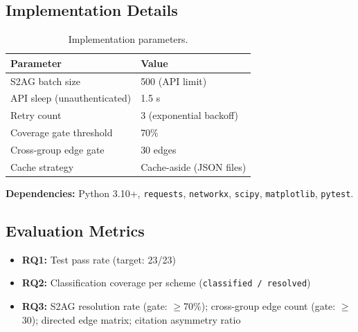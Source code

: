 \subsection{Implementation Details}

\begin{table}[h]
\centering
\caption{Implementation parameters.}
\label{tab:params}
\begin{tabular}{ll}
\toprule
Parameter & Value \\
\midrule
S2AG batch size & 500 (API limit) \\
API sleep (unauthenticated) & 1.5 s \\
Retry count & 3 (exponential backoff) \\
Coverage gate threshold & 70\% \\
Cross-group edge gate & 30 edges \\
Cache strategy & Cache-aside (JSON files) \\
\bottomrule
\end{tabular}
\end{table}

\textbf{Dependencies:} Python 3.10+, \texttt{requests}, \texttt{networkx}, \texttt{scipy}, \texttt{matplotlib}, \texttt{pytest}.

\subsection{Evaluation Metrics}

\begin{itemize}
\item \textbf{RQ1:} Test pass rate (target: 23/23)
\item \textbf{RQ2:} Classification coverage per scheme (\texttt{classified / resolved})
\item \textbf{RQ3:} S2AG resolution rate (gate: $\geq$70\%); cross-group edge count (gate: $\geq$30); directed edge matrix; citation asymmetry ratio
\end{itemize}
